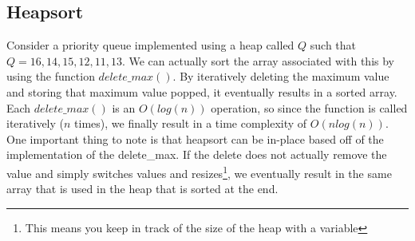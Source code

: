 \documentclass[11pt,a4paper,english]{article}
\begin{document}
\subsection{Heapsort}

Consider a priority queue implemented using a heap called $Q$ such that $Q = {16, 14, 15, 12, 11, 13}$. We can actually sort the array associated with this by using the function $delete\_max()$. By iteratively deleting the maximum value and storing that maximum value popped, it eventually results in a sorted array. Each $delete\_max()$ is an $O(log(n))$ operation, so since the function is called iteratively ($n$ times), we finally result in a time complexity of $O(n log(n))$.
\bigskip
\noindent One important thing to note is that heapsort can be in-place based off of the implementation of the delete\_max. If the delete does not actually remove the value and simply switches values and resizes\footnote{This means you keep in track of the size of the heap with a variable}, we eventually result in the same array that is used in the heap that is sorted at the end. 
\end{document}
